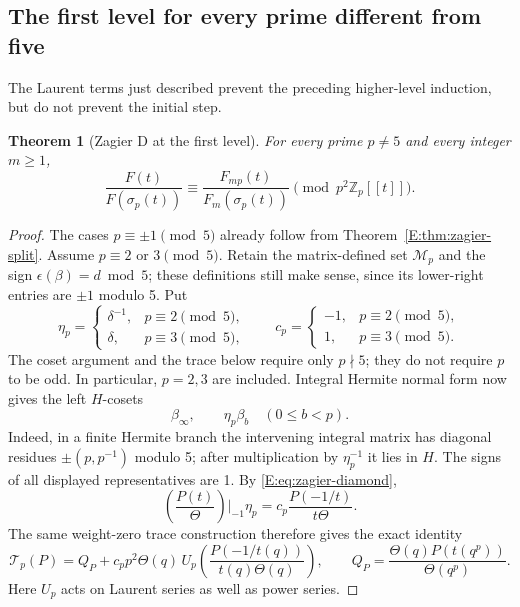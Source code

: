 \documentclass[11pt,a4paper]{article}
\newtheorem{theorem}{Theorem}[section]
\theoremstyle{definition}\newtheorem{definition}[theorem]{Definition}
\theoremstyle{remark}\newtheorem{remark}[theorem]{Remark}
\numberwithin{equation}{section}
\begin{document}
\subsection{The first level for every prime different from five}

The Laurent terms just described prevent the preceding higher-level
induction, but do not prevent the initial step.

\begin{theorem}[Zagier D at the first level]\label{E:thm:zagier-first-level}
For every prime \(p\ne5\) and every integer \(m\ge1\),
\[
 \frac{F(t)}{F(\sigma_p(t))}
 \equiv
 \frac{F_{mp}(t)}{F_m(\sigma_p(t))}
 \pmod{p^2\mathbb Z_p[[t]]}.
\]
\end{theorem}

\begin{proof}
The cases \(p\equiv\pm1\pmod5\) already follow from
Theorem~\ref{E:thm:zagier-split}.  Assume \(p\equiv2\) or
\(3\pmod5\).  Retain the matrix-defined set
\(\mathcal M_p\) and the sign \(\epsilon(\beta)=d\bmod5\);
these definitions still make sense, since its lower-right
entries are \(\pm1\) modulo 5.  Put
\[
 \eta_p=\begin{cases}\delta^{-1},&p\equiv2\pmod5,\\
                     \delta,&p\equiv3\pmod5,\end{cases}
 \qquad
 c_p=\begin{cases}-1,&p\equiv2\pmod5,\\
                  1,&p\equiv3\pmod5.\end{cases}
\]
The coset argument and the trace below require only \(p\nmid5\);
they do not require \(p\) to be odd.  In particular, \(p=2,3\)
are included.
Integral Hermite normal form now gives the left \(H\)-cosets
\[
 \beta_\infty,\qquad \eta_p\beta_b\quad(0\le b<p).
\]
Indeed, in a finite Hermite branch the intervening integral
matrix has diagonal residues \(\pm(p,p^{-1})\) modulo 5;
after multiplication by \(\eta_p^{-1}\) it lies in \(H\).
The signs of all displayed representatives are 1.
By \eqref{E:eq:zagier-diamond},
\[
 \left(\frac{P(t)}{\Theta}\right)\bigg|_{-1}\eta_p
 =c_p\frac{P(-1/t)}{t\Theta}.
\]
The same weight-zero trace construction therefore gives the
exact identity
\begin{equation}\label{E:eq:zagier-laurent-trace}
 \mathcal T_p(P)
 = Q_P+c_pp^2\Theta(q)\,
       U_p\left(\frac{P(-1/t(q))}{t(q)\Theta(q)}\right),
 \qquad
 Q_P=\frac{\Theta(q)P(t(q^p))}{\Theta(q^p)}.
\end{equation}
Here \(U_p\) acts on Laurent series as well as power series.


\end{proof}
\end{document}
